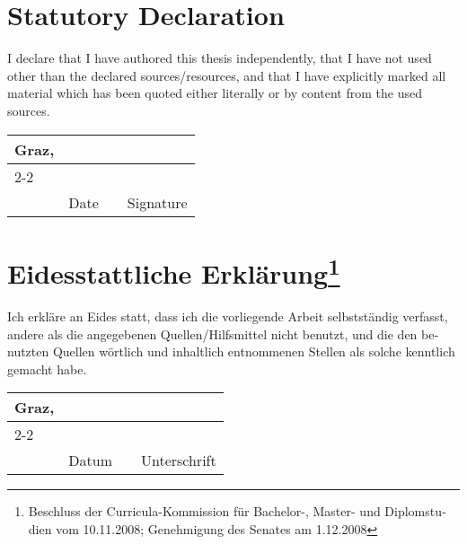 \newpage

\vfill

\section*{Statutory Declaration}

I declare that I have authored this thesis independently, that I have
not used other than the declared sources/resources, and that I have
explicitly marked all material which has been quoted either literally
or by content from the used sources.

\vfill

\newcommand{\mysignatureblock}[3]{%
  \begin{tabular}{llp{2em}l} 
  #1 & \hspace{5cm}        & & \hspace{6cm} \\\cline{2-2}\cline{4-4}
     &                     & & \\[-3mm]
     & {\footnotesize #2}  & & {\footnotesize #3}
  \end{tabular}
}

\mysignatureblock{Graz,}{Date}{Signature}

\vfill
\vfill

\section*{Eidesstattliche Erklärung\footnote{%
\foreignlanguage{ngerman}{Beschluss der Curricula-Kommission für Bachelor-, Master- und 
Diplomstudien vom 10.11.2008; 
Genehmigung des Senates am 1.12.2008}}}

\foreignlanguage{ngerman}{%
Ich erkläre an Eides statt, dass ich die
vorliegende Arbeit selbstständig verfasst, andere als die angegebenen
Quellen/Hilfsmittel nicht benutzt, und die den benutzten Quellen
wörtlich und inhaltlich entnommenen Stellen als solche kenntlich
gemacht habe.}

\vfill

\mysignatureblock{Graz,}{Datum}{Unterschrift}

\setcounter{footnote}{0}
